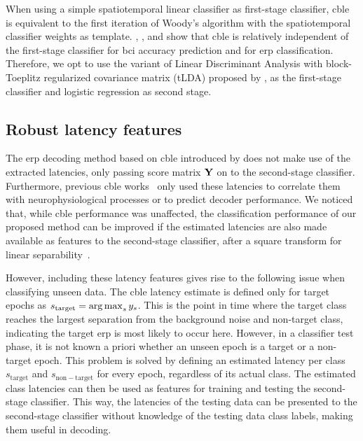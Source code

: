 When using a simple spatiotemporal linear classifier as first-stage classifier,
\ac{cble} is equivalent to the first iteration of Woody's algorithm with the
spatiotemporal classifier weights as template.
\textcite{Thompson2012}, \textcite{Mowla2017}, and \textcite{Mowla2020} show
that \ac{cble} is relatively independent of the first-stage classifier for \ac{bci}
accuracy prediction and for \ac{erp} classification.
Therefore, we opt to use the variant of Linear Discriminant Analysis with block-Toeplitz
regularized covariance matrix (tLDA) proposed by \textcite{Sosulski2022}, as the first-stage
classifier and logistic regression as second stage.

\subsection{Robust latency features}
\label{sec:robust-latency}
The \ac{erp} decoding method based on \ac{cble} introduced by \textcite{Mowla2017} does
not make use of the extracted latencies, only passing score matrix $\mathbf{Y}$ on
to the second-stage classifier.
Furthermore, previous \ac{cble} works~\cite{Thompson2012, Mowla2020} only used these
latencies to correlate them with neurophysiological processes or to predict
decoder performance.
We noticed that, while \ac{cble} performance was unaffected, the classification
performance of our proposed method can be improved if the estimated
latencies are also made available as features to the second-stage classifier,
after a square transform for linear separability~\cite{Thompson2012}.

However, including these latency features gives rise to the following issue when
classifying unseen data.
The \ac{cble} latency estimate is defined only for target epochs as
$\textstyle{s_\mathrm{target}=\operatorname*{arg\,max}_s{y_s}}$.
This is the point in time where the target class reaches the largest separation
from the background noise and non-target class, indicating the target \ac{erp} is
most likely to occur here.
However, in a classifier test phase, it is not known a priori whether an
unseen epoch is a target or a non-target epoch.
This problem is solved by defining an estimated latency per class
$s_\mathrm{target}$ and $s_\mathrm{non-target}$ for every epoch,
regardless of its actual class.
The estimated class latencies can then be used as features for training and
testing the second-stage classifier.
This way, the latencies of the testing data can be presented to the second-stage
classifier without knowledge of the testing data class labels, making them
useful in decoding.

